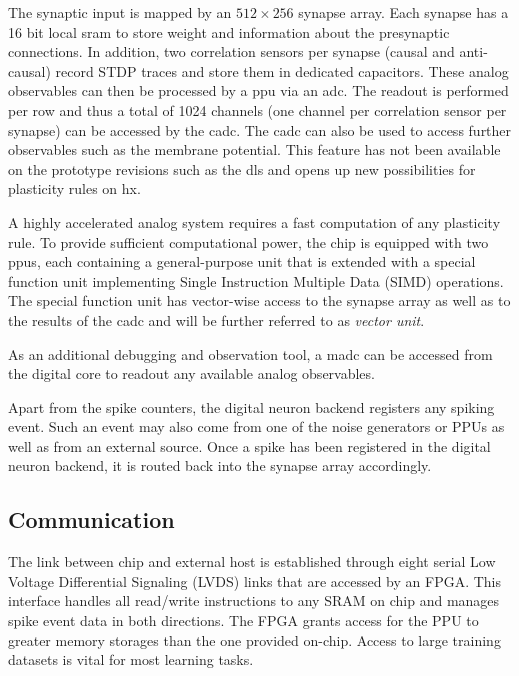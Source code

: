 The synaptic input is mapped by an $512 \times 256$ synapse array. Each synapse has a 16 bit local \gls{sram} to store weight and information about the presynaptic connections. In addition, two correlation sensors per synapse (causal and anti-causal) record STDP traces and store them in dedicated capacitors. These analog observables can then be processed by a \gls{ppu} via an \gls{adc}. The readout is performed per row and thus a total of 1024 channels (one channel per correlation sensor per synapse) can be accessed by the \gls{cadc}. The \gls{cadc} can also be used to access further observables such as the membrane potential. This feature has not been available on the prototype revisions such as the \gls{dls} and opens up new possibilities for plasticity rules on \gls{hx}.

A highly accelerated analog system requires a fast computation of any plasticity rule. To provide sufficient computational power, the chip is equipped with two \glspl{ppu}, each containing a general-purpose unit that is extended with a special function unit implementing Single Instruction Multiple Data (SIMD) operations. The special function unit has vector-wise access to the synapse array as well as to the results of the \gls{cadc} and will be further referred to as \textit{vector unit}.

As an additional debugging and observation tool, a \gls{madc} can be accessed from the digital core to readout any available analog observables.

Apart from the spike counters, the digital neuron backend registers any spiking event. Such an event may also come from one of the noise generators or PPUs as well as from an external source. Once a spike has been registered in the digital neuron backend, it is routed back into the synapse array accordingly. 

\subsection{Communication}
The link between chip and external host is established through eight serial Low Voltage Differential Signaling (LVDS) links that are accessed by an FPGA. This interface handles all read/write instructions to any SRAM on chip and manages spike event data in both directions. The FPGA grants access for the PPU to greater memory storages than the one provided on-chip. Access to large training datasets is vital for most learning tasks.

